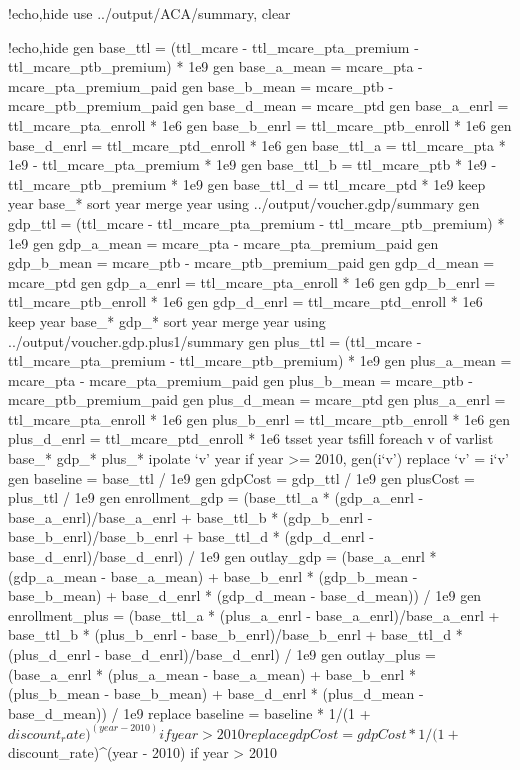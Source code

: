 \documentclass{article}
\begin{document}
\begin{Statacode}{!echo,hide}
use ../output/ACA/summary, clear
\end{Statacode}
\begin{Statacode}{!echo,hide}
gen base_ttl = (ttl_mcare - ttl_mcare_pta_premium - ttl_mcare_ptb_premium) * 1e9
gen base_a_mean = mcare_pta - mcare_pta_premium_paid
gen base_b_mean = mcare_ptb - mcare_ptb_premium_paid
gen base_d_mean = mcare_ptd
gen base_a_enrl = ttl_mcare_pta_enroll * 1e6
gen base_b_enrl = ttl_mcare_ptb_enroll * 1e6
gen base_d_enrl = ttl_mcare_ptd_enroll * 1e6
gen base_ttl_a = ttl_mcare_pta * 1e9 - ttl_mcare_pta_premium * 1e9
gen base_ttl_b = ttl_mcare_ptb * 1e9 - ttl_mcare_ptb_premium * 1e9
gen base_ttl_d = ttl_mcare_ptd * 1e9
keep year base_*
sort year
merge year using ../output/voucher.gdp/summary
gen gdp_ttl = (ttl_mcare - ttl_mcare_pta_premium - ttl_mcare_ptb_premium) * 1e9
gen gdp_a_mean = mcare_pta - mcare_pta_premium_paid
gen gdp_b_mean = mcare_ptb - mcare_ptb_premium_paid
gen gdp_d_mean = mcare_ptd
gen gdp_a_enrl = ttl_mcare_pta_enroll * 1e6
gen gdp_b_enrl = ttl_mcare_ptb_enroll * 1e6
gen gdp_d_enrl = ttl_mcare_ptd_enroll * 1e6
keep year base_* gdp_*
sort year
merge year using ../output/voucher.gdp.plus1/summary
gen plus_ttl = (ttl_mcare - ttl_mcare_pta_premium - ttl_mcare_ptb_premium) * 1e9
gen plus_a_mean = mcare_pta - mcare_pta_premium_paid
gen plus_b_mean = mcare_ptb - mcare_ptb_premium_paid
gen plus_d_mean = mcare_ptd
gen plus_a_enrl = ttl_mcare_pta_enroll * 1e6
gen plus_b_enrl = ttl_mcare_ptb_enroll * 1e6
gen plus_d_enrl = ttl_mcare_ptd_enroll * 1e6
tsset year
tsfill
foreach v of varlist base_* gdp_* plus_* {
  ipolate `v' year if year >= 2010, gen(i`v')
  replace `v' = i`v'
}
gen baseline = base_ttl / 1e9
gen gdpCost = gdp_ttl / 1e9
gen plusCost = plus_ttl / 1e9
gen enrollment_gdp = (base_ttl_a * (gdp_a_enrl - base_a_enrl)/base_a_enrl + base_ttl_b * (gdp_b_enrl - base_b_enrl)/base_b_enrl + base_ttl_d * (gdp_d_enrl - base_d_enrl)/base_d_enrl) / 1e9
gen outlay_gdp = (base_a_enrl * (gdp_a_mean - base_a_mean) + base_b_enrl * (gdp_b_mean - base_b_mean) + base_d_enrl * (gdp_d_mean - base_d_mean)) / 1e9
gen enrollment_plus = (base_ttl_a * (plus_a_enrl - base_a_enrl)/base_a_enrl + base_ttl_b * (plus_b_enrl - base_b_enrl)/base_b_enrl + base_ttl_d * (plus_d_enrl - base_d_enrl)/base_d_enrl) / 1e9
gen outlay_plus = (base_a_enrl * (plus_a_mean - base_a_mean) + base_b_enrl * (plus_b_mean - base_b_mean) + base_d_enrl * (plus_d_mean - base_d_mean)) / 1e9
replace baseline = baseline * 1/(1 + $discount_rate)^(year - 2010) if year > 2010
replace gdpCost = gdpCost * 1/(1 + $discount_rate)^(year - 2010) if year > 2010

\end{Statacode}
\end{document}
